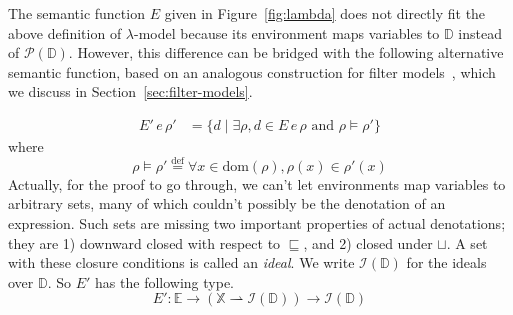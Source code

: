 \documentclass{tufte-handout}
\newcommand{\defeq}[0]{\overset{\mathrm{def}}{=}}
\newcommand{\pto}[0]{\rightharpoonup}
\newcommand{\VAR}[0]{\mathbb{X}}
\begin{document}
The semantic function $E$ given in Figure~\ref{fig:lambda} does not
directly fit the above definition of $\lambda$-model because its
environment maps variables to $\mathbb{D}$ instead of
$\mathcal{P}(\mathbb{D})$. However, this difference can be bridged
with the following alternative semantic function, based on an
analogous construction for filter models~\citep{Alessi:2006aa}, which
we discuss in Section~\ref{sec:filter-models}.

\begin{align*}
  E'\,e\,\rho' &=
  \{ d \mid \exists \rho, d \in E\,e\,\rho
  \text{ and } \rho \models \rho' \}
\end{align*}
where
\[
\rho\models\rho' \defeq \forall x \in\mathrm{dom}(\rho),\rho(x)\in \rho'(x)
\]
Actually, for the proof to go through, we can't let environments map
variables to arbitrary sets, many of which couldn't possibly be the
denotation of an expression. Such sets are missing two important
properties of actual denotations; they are 1) downward closed with
respect to $\sqsubseteq$, and 2) closed under $\sqcup$. A set with
these closure conditions is called an \emph{ideal}. We write
$\mathcal{I}(\mathbb{D})$ for the ideals over $\mathbb{D}$.  So $E'$
has the following type.
\[
  E' : \mathbb{E} \to (\VAR\pto \mathcal{I}(\mathbb{D}))
  \to \mathcal{I}(\mathbb{D}) 
\]
\end{document}
